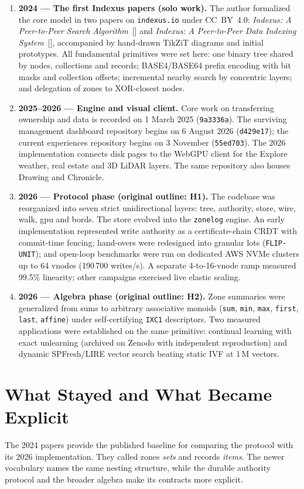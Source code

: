 \documentclass[11pt]{article}
\begin{document}
\begin{enumerate}[leftmargin=1.5em,itemsep=2pt]
  \item \textbf{2024 --- The first Indexus papers (solo work).} The author formalized the core model in two papers on \texttt{indexus.io} under CC~BY~4.0: \emph{Indexus: A Peer-to-Peer Search Algorithm}~[] and \emph{Indexus: A Peer-to-Peer Data Indexing System}~[], accompanied by hand-drawn TikZiT diagrams and initial prototypes. All fundamental primitives were set here: one binary tree shared by nodes, collections and records; BASE4/BASE64 prefix encoding with bit masks and collection offsets; incremental nearby search by concentric layers; and delegation of zones to XOR-closest nodes.
  \item \textbf{2025--2026 --- Engine and visual client.} Core work on transferring ownership and data is recorded on 1 March 2025 (\texttt{9a3336a}). The surviving management dashboard repository begins on 6 August 2026 (\texttt{d429e17}); the current experiences repository begins on 3 November (\texttt{55ed703}). The 2026 implementation connects disk pages to the WebGPU client for the Explore weather, real estate and 3D LiDAR layers. The same repository also houses Drawing and Chronicle.
  \item \textbf{2026 --- Protocol phase (original outline: H1).} The codebase was reorganized into seven strict unidirectional layers: tree, authority, store, wire, walk, gpu and bords. The store evolved into the \texttt{zonelog} engine. An early implementation represented write authority as a certificate-chain CRDT with commit-time fencing; hand-overs were redesigned into granular lots (\texttt{FLIP-UNIT}); and open-loop benchmarks were run on dedicated AWS NVMe clusters up to 64 vnodes (190\,700 writes/s). A separate 4-to-16-vnode ramp measured 99.5\% linearity; other campaigns exercised live elastic scaling.
  \item \textbf{2026 --- Algebra phase (original outline: H2).} Zone summaries were generalized from sums to arbitrary associative monoids (\texttt{sum}, \texttt{min}, \texttt{max}, \texttt{first}, \texttt{last}, \texttt{affine}) under self-certifying \texttt{IXC1} descriptors. Two measured applications were established on the same primitive: continual learning with exact unlearning (archived on Zenodo with independent reproduction) and dynamic SPFresh/LIRE vector search beating static IVF at 1\,M vectors.
\end{enumerate}

\section{What Stayed and What Became Explicit}
The 2024 papers provide the published baseline for comparing the protocol with its 2026 implementation. They called zones \emph{sets} and records \emph{items}. The newer vocabulary names the same nesting structure, while the durable authority protocol and the broader algebra make its contracts more explicit.
\end{document}
